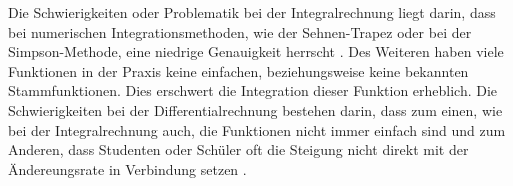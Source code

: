 Die Schwierigkeiten oder Problematik bei der Integralrechnung liegt darin, dass bei numerischen Integrationsmethoden, wie der Sehnen-Trapez oder bei der Simpson-Methode, eine niedrige Genauigkeit herrscht \textsc{\cite[S. 205]{WingMatheProblem_S218}}. Des Weiteren haben viele Funktionen in der Praxis keine einfachen, beziehungsweise keine bekannten Stammfunktionen. Dies erschwert die Integration dieser Funktion erheblich.
Die Schwierigkeiten bei der Differentialrechnung bestehen darin, dass zum einen, wie bei der Integralrechnung auch, die Funktionen nicht immer einfach sind und zum Anderen, dass Studenten oder Schüler oft die Steigung nicht direkt mit der Ändereungsrate in Verbindung setzen \textsc{\cite[S. 78]{AbleitungMatheWingWis_S78}}. 
